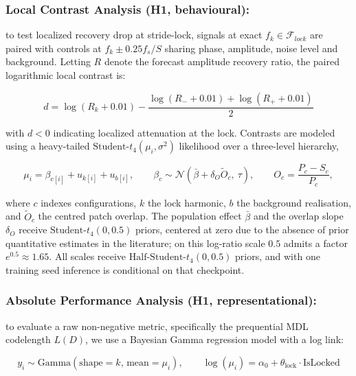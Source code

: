 \subsubsection{Local Contrast Analysis (H1, behavioural):} to test localized recovery drop at stride-lock, signals at exact $f_k\in \mathcal F_{lock}$ are paired with controls at $f_k \pm 0.25 f_s / S$ sharing phase, amplitude, noise level and background. Letting $R$ denote the forecast amplitude recovery ratio, the paired logarithmic local contrast is:

\begin{equation}
\label{eq:contrast}
d
=
\log(R_k + 0.01)
-
\frac{\log(R_- + 0.01)
+
\log(R_+ + 0.01)}{2}
\end{equation}

with $d < 0$ indicating localized attenuation at the lock. Contrasts are modeled using a heavy-tailed $\text{Student-}t_4(\mu_i, \sigma^2)$ likelihood over a three-level hierarchy,

\begin{equation}
\label{eq:contrast_hier}
\mu_i
=
\beta_{c[i]}
+
u_{k[i]}
+
u_{b[i]},
\qquad
\beta_c
\sim
\mathcal{N}\!\left(\bar\beta + \delta_O \widetilde O_c,\ \tau\right),
\qquad
O_c
=
\frac{P_c - S_c}{P_c},
\end{equation}

where $c$ indexes configurations, $k$ the lock harmonic, $b$ the background realisation, and $\widetilde O_c$ the centred patch overlap. The population effect $\bar\beta$ and the overlap slope $\delta_O$ receive $\text{Student-}t_4(0,0.5)$ priors, centered at zero due to the absence of prior quantitative estimates in the literature; on this log-ratio scale $0.5$ admits a factor $e^{0.5}\approx1.65$. All scales receive $\text{Half-Student-}t_4(0,0.5)$ priors, and with one training seed inference is conditional on that checkpoint.

\subsubsection{Absolute Performance Analysis (H1, representational):} to evaluate a raw non-negative metric, specifically the prequential MDL codelength $L(D)$, we use a Bayesian Gamma regression model with a log link:

\begin{equation}
\label{eq:gamma_reg}
y_i
\sim
\text{Gamma}(\text{shape} = k, \, \text{mean} = \mu_i),
\qquad
\log(\mu_i)
=
\alpha_0
+
\theta_{\text{lock}}
\cdot
\text{IsLocked}
\end{equation}

